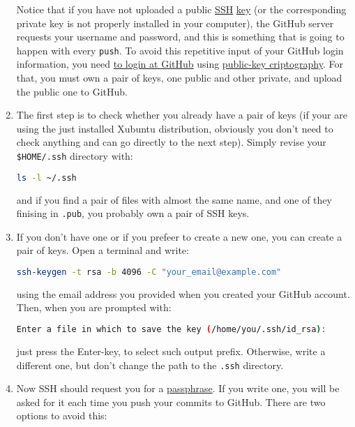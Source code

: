 \begin{enumerate}
  Notice that if you have not uploaded a public
  \href{https://www.ssh.com/}{SSH}
  \href{https://www.ssh.com/ssh/identity-key}{key} (or the
  corresponding private key is not properly installed in your
  computer), the GitHub server requests your username and password,
  and this is something that is going to happen with every
  \texttt{push}. To avoid this repetitive input of your GitHub login
  information, you need
  \href{https://docs.github.com/en/github/authenticating-to-github/connecting-to-github-with-ssh}{to
    login at GitHub} using
  \href{https://en.wikipedia.org/wiki/Public-key_cryptography}{public-key
    criptography}. For that, you must own a pair of keys, one public
  and other private, and upload the public one to GitHub.
  
\item The first step is to check whether you already have a pair of
  keys (if your are using the just installed Xubuntu distribution,
  obviously you don't need to check anything and can go directly to
  the next step). Simply revise your \texttt{\$HOME/.ssh} directory
  with:

  \begin{lstlisting}[language=bash]
    ls -l ~/.ssh
  \end{lstlisting}

  and if you find a pair of files with almost the same name, and one
  of they finising in \texttt{.pub}, you probably own a pair of SSH
  keys.

\item If you don't have one or if you prefeer to create a new one,
  you can create a pair of keys. Open a terminal and write:

  \begin{lstlisting}[language=bash]
    ssh-keygen -t rsa -b 4096 -C "your_email@example.com"
  \end{lstlisting}

  using the email address you provided when you created your GitHub
  account. Then, when you are prompted with:

  \begin{lstlisting}[language=bash]
    Enter a file in which to save the key (/home/you/.ssh/id_rsa):
  \end{lstlisting}

  just press the Enter-key, to select such output prefix. Otherwise,
  write a different one, but don't change the path to the
  \texttt{.ssh} directory.

\item Now SSH should request you for a
  \href{https://en.wikipedia.org/wiki/Passphrase}{passphrase}. If you
  write one, you will be asked for it each time you push your commits
  to GitHub. There are two options to avoid this:


\end{enumerate}
